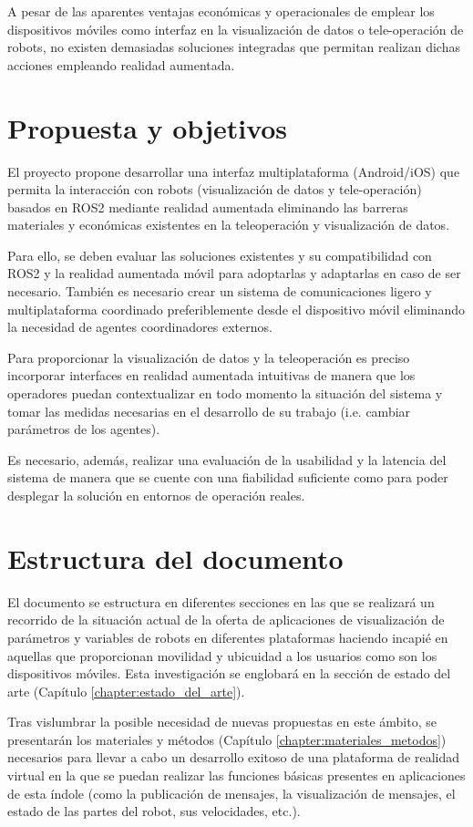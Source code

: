 A pesar de las aparentes ventajas económicas y operacionales de 
emplear los dispositivos móviles como interfaz en la 
visualización de datos o tele-operación de robots, no existen 
demasiadas soluciones integradas que permitan realizan dichas 
acciones empleando realidad aumentada.


\section{Propuesta y objetivos}
El proyecto propone desarrollar una interfaz multiplataforma (Android/iOS) 
que permita la interacción con robots (visualización de datos y 
tele-operación) basados en ROS2 
mediante realidad aumentada eliminando las barreras materiales 
y económicas existentes en
la teleoperación y visualización de datos.

Para ello, se deben evaluar las soluciones existentes y su compatibilidad
con ROS2 y la realidad aumentada móvil para adoptarlas y adaptarlas en caso de 
ser necesario. 
También es necesario crear un sistema de comunicaciones ligero
y multiplataforma coordinado preferiblemente desde el dispositivo móvil eliminando
la necesidad de agentes coordinadores externos.

Para proporcionar la visualización de datos y la teleoperación es preciso 
incorporar interfaces en realidad aumentada intuitivas de manera que los 
operadores puedan contextualizar en todo momento la situación del sistema 
y tomar las medidas necesarias en el desarrollo de su trabajo (i.e. cambiar
parámetros de los agentes).

Es necesario, además, realizar una evaluación de la usabilidad y la latencia 
del sistema de manera que se cuente con una fiabilidad suficiente como 
para poder desplegar la solución en entornos de operación reales.

\section{Estructura del documento}
El documento se estructura en diferentes secciones en las que se realizará un recorrido de la situación actual de la oferta 
de aplicaciones de visualización de parámetros y variables de robots en diferentes plataformas haciendo incapié en aquellas
que proporcionan movilidad y ubicuidad a los usuarios como son los dispositivos móviles. Esta investigación se englobará en la
sección de estado del arte (Capítulo \ref{chapter:estado_del_arte}).

Tras vislumbrar la posible necesidad de nuevas propuestas en este ámbito, se presentarán los materiales y métodos (Capítulo \ref{chapter:materiales_metodos})
necesarios para llevar a cabo un desarrollo exitoso de una plataforma de realidad virtual en la que se puedan realizar 
las funciones básicas presentes en aplicaciones de esta índole (como la publicación de mensajes, la visualización de mensajes, 
el estado de las partes del robot, sus velocidades, etc.).

